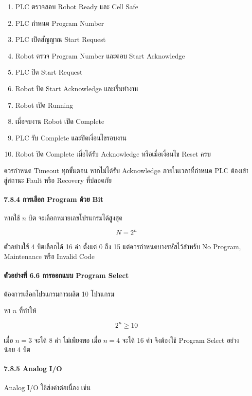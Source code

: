 \begin{enumerate}
    \item PLC ตรวจสอบ Robot Ready และ Cell Safe
    \item PLC กำหนด Program Number
    \item PLC เปิดสัญญาณ Start Request
    \item Robot ตรวจ Program Number และตอบ Start Acknowledge
    \item PLC ปิด Start Request
    \item Robot ปิด Start Acknowledge และเริ่มทำงาน
    \item Robot เปิด Running
    \item เมื่อจบงาน Robot เปิด Complete
    \item PLC รับ Complete และปิดเงื่อนไขรอบงาน
    \item Robot ปิด Complete เมื่อได้รับ Acknowledge หรือเมื่อเงื่อนไข Reset ครบ
\end{enumerate}

ควรกำหนด Timeout ทุกขั้นตอน หากไม่ได้รับ Acknowledge ภายในเวลาที่กำหนด PLC ต้องเข้าสู่สถานะ Fault หรือ Recovery ที่ปลอดภัย

\paragraph{7.8.4 การเลือก Program ด้วย Bit}

หากใช้ $n$ บิต จะเลือกหมายเลขโปรแกรมได้สูงสุด

\[
N=2^n
\]

ตัวอย่างใช้ 4 บิตเลือกได้ 16 ค่า ตั้งแต่ 0 ถึง 15 แต่ควรกำหนดบางรหัสไว้สำหรับ No Program, Maintenance หรือ Invalid Code

\paragraph{ตัวอย่างที่ 6.6 การออกแบบ Program Select}

ต้องการเลือกโปรแกรมการผลิต 10 โปรแกรม

หา $n$ ที่ทำให้

\[
2^n\ge10
\]

เมื่อ $n=3$ จะได้ 8 ค่า ไม่เพียงพอ เมื่อ $n=4$ จะได้ 16 ค่า จึงต้องใช้ Program Select อย่างน้อย 4 บิต

\paragraph{7.8.5 Analog I/O}

Analog I/O ใช้ส่งค่าต่อเนื่อง เช่น

